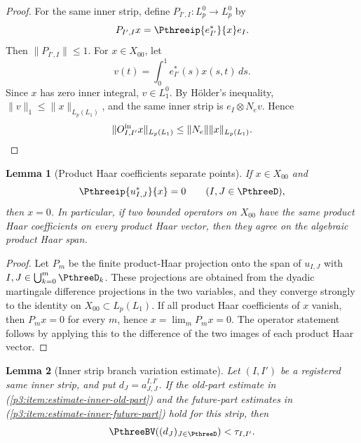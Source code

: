 \documentclass[11pt,reqno]{amsart}
\makeatletter
\theoremstyle{plain}
\newtheorem{lemma}[lemma]{Lemma}
\theoremstyle{definition}
\newcounter{problempaper}
\newenvironment{problempaperbody}{%
  \setcounter{subsection}{0}%
  \setcounter{subsubsection}{0}%
  \setcounter{paragraph}{0}%
  \renewcommand{\thesubsection}{\arabic{subsection}}%
  \renewcommand{\thesubsubsection}{\thesubsection.\arabic{subsubsection}}%
  \renewcommand{\theparagraph}{\thesubsubsection.\arabic{paragraph}}%
  \let\problem@outersection\section
  \let\problem@outersubsection\subsection
  \let\problem@outersubsubsection\subsubsection
  \let\problem@outerparagraph\paragraph
  \let\section\problem@papersection
  \let\subsection\problem@papersubsection
  \let\subsubsection\problem@papersubsubsection
}{%
  \let\section\problem@outersection
  \let\subsection\problem@outersubsection
  \let\subsubsection\problem@outersubsubsection
  \let\paragraph\problem@outerparagraph
}
\newcommand{\problem@target}[2]{%
  \hypertarget{problem-\theproblempaper-#1-#2}{}%
}
\newcommand{\problem@paperheading}[3]{%
  \par\bigskip
  \problem@target{#1}{#2}%
  \noindent{\large\bfseries #2.\quad #3\par}%
  \nobreak\smallskip
}
\newcommand{\problem@papersubheading}[3]{%
  \par\medskip
  \problem@target{#1}{#2}%
  \noindent{\normalsize\bfseries #2.\quad #3\par}%
  \nobreak\smallskip
}
\newcommand{\problem@papersubsubheading}[3]{%
  \par\smallskip
  \problem@target{#1}{#2}%
  \noindent{\normalsize\itshape #2.\quad #3.\ }%
}
\def\problem@papersection{%
  \@ifstar{\problem@papersectionstar}{\problem@papersectionnostar}%
}
\def\problem@papersectionstar#1{%
  \par\bigskip\noindent{\large\bfseries #1\par}\nobreak\smallskip
}
\def\problem@papersectionnostar#1{%
  \refstepcounter{subsection}%
  \setcounter{subsubsection}{0}%
  \setcounter{paragraph}{0}%
  \problem@paperheading{section}{\thesubsection}{#1}%
  \problem@writecontentsline{section}{\thesubsection}{#1}%
}
\def\problem@papersubsection{%
  \@ifstar{\problem@papersubsectionstar}{\problem@papersubsectionnostar}%
}
\def\problem@papersubsectionstar#1{%
  \par\medskip\noindent{\normalsize\bfseries #1\par}\nobreak\smallskip
}
\def\problem@papersubsectionnostar#1{%
  \refstepcounter{subsubsection}%
  \setcounter{paragraph}{0}%
  \problem@papersubheading{subsection}{\thesubsubsection}{#1}%
  \problem@writecontentsline{subsection}{\thesubsubsection}{#1}%
}
\def\problem@papersubsubsection{%
  \@ifstar{\problem@papersubsubsectionstar}{\problem@papersubsubsectionnostar}%
}
\def\problem@papersubsubsectionstar#1{%
  \par\smallskip\noindent{\normalsize\itshape #1.\ }%
}
\def\problem@papersubsubsectionnostar#1{%
  \refstepcounter{paragraph}%
  \problem@papersubsubheading{subsubsection}{\theparagraph}{#1}%
  \problem@writecontentsline{subsubsection}{\theparagraph}{#1}%
}
\newcommand{\problem@writecontentsline}[3]{%
  \begingroup
  \protected@write\@auxout{}{%
    \string\problemcontentsentry{\theproblempaper}{#1}{#2}{#3}{\thepage}%
  }%
  \endgroup
}
\newcommand{\problemcontentsentry}[5]{%
  \@ifundefined{problemcontents@#1}{%
    \expandafter\gdef\csname problemcontents@#1\endcsname{}%
  }{}%
  \expandafter\g@addto@macro\csname problemcontents@#1\endcsname{%
    \problemcontentsline{#1}{#2}{#3}{#4}{#5}%
  }%
}
\newcommand{\problemcontentslink}[4]{%
  \hyperlink{problem-#1-#2-#3}{#4}%
}
\newcommand{\problemcontentsline}[5]{%
  \ifstrequal{#2}{section}{%
    \par\noindent
    \problemcontentslink{#1}{#2}{#3}{\makebox[2.5em][l]{#3}#4}%
    \nobreak\dotfill
    \problemcontentslink{#1}{#2}{#3}{#5}\par
  }{%
    \ifstrequal{#2}{subsection}{%
      \par\noindent\hspace*{1.5em}%
      \problemcontentslink{#1}{#2}{#3}{\makebox[3.5em][l]{#3}#4}%
      \nobreak\dotfill
      \problemcontentslink{#1}{#2}{#3}{#5}\par
    }{%
      \par\noindent\hspace*{3em}%
      \problemcontentslink{#1}{#2}{#3}{\makebox[4.5em][l]{#3}#4}%
      \nobreak\dotfill
      \problemcontentslink{#1}{#2}{#3}{#5}\par
    }%
  }%
}
\makeatother
\begin{document}
\begin{problempaperbody}
\begin{proof}
For the same inner strip, define $P_{I',I}\colon L_p^0\to L_p^0$ by
\begin{equation*}
        P_{I',I}x=\Pthreeip{e_{I'}^*}{x}e_I.
\end{equation*}
Then $\|P_{I',I}\|\leq1$. For $x\in X_{00}$, let
\begin{equation*}
        v(t)=\int_0^1 e_{I'}^*(s)x(s,t)\,ds.
\end{equation*}
Since $x$ has zero inner integral, $v\in L_1^0$. By H\"older's inequality, $\|v\|_1\leq\|x\|_{L_p(L_1)}$, and the same inner strip is $e_I\otimes N_ev$. Hence
\begin{equation*}
        \|O_{I,I'}^{\rm in}x\|_{L_p(L_1)}\leq\|N_e\|\|x\|_{L_p(L_1)}.
\end{equation*}
\end{proof}

\begin{lemma}[Product Haar coefficients separate points]
\label{p3:lem:product-coefficient-separation}
If $x\in X_{00}$ and
\begin{equation*}
        \Pthreeip{u_{I,J}^*}{x}=0\qquad(I,J\in\PthreeD),
\end{equation*}
then $x=0$. In particular, if two bounded operators on $X_{00}$ have the same product Haar coefficients on every product Haar vector, then they agree on the algebraic product Haar span.
\end{lemma}

\begin{proof}
Let $P_m$ be the finite product-Haar projection onto the span of $u_{I,J}$ with $I,J\in\bigcup_{k=0}^{m}\PthreeD_k$. These projections are obtained from the dyadic martingale difference projections in the two variables, and they converge strongly to the identity on $X_{00}\subset L_p(L_1)$. If all product Haar coefficients of $x$ vanish, then $P_mx=0$ for every $m$, hence $x=\lim_mP_mx=0$. The operator statement follows by applying this to the difference of the two images of each product Haar vector.
\end{proof}

\begin{lemma}[Inner strip branch variation estimate]
\label{p3:lem:inner-strip-branch-variation}
Let $(I,I')$ be a registered same inner strip, and put $d_J=a_{J,J}^{I,I'}$. If the old-part estimate in \textup{(\ref{p3:item:estimate-inner-old-part})} and the future-part estimates in \textup{(\ref{p3:item:estimate-inner-future-part})} hold for this strip, then
\begin{equation*}
        \PthreeBV((d_J)_{J\in\PthreeD})<\tau_{I,I'}.
\end{equation*}
\end{lemma}


\end{problempaperbody}
\end{document}
